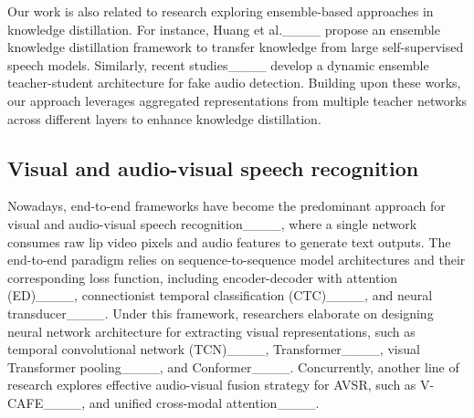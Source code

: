 
Our work is also related to research exploring ensemble-based approaches in knowledge distillation. 
For instance, Huang et al.____ propose an ensemble knowledge distillation framework to transfer knowledge from large self-supervised speech models. 
Similarly, recent studies____ develop a dynamic ensemble teacher-student architecture for fake audio detection. 
Building upon these works, our approach leverages aggregated representations from multiple teacher networks across different layers to enhance knowledge distillation.

 



\subsection{Visual and audio-visual speech recognition}

Nowadays, end-to-end frameworks have become the predominant approach for
visual and audio-visual speech recognition____, where a single network consumes raw lip video pixels and audio features to generate text outputs. The end-to-end paradigm relies on sequence-to-sequence model architectures and their corresponding loss function, including encoder-decoder with attention (ED)____, connectionist temporal classification (CTC)____, and neural transducer____. 
Under this framework, researchers elaborate on designing neural network architecture for extracting visual representations, such as
 temporal convolutional network (TCN)____, Transformer____, visual Transformer pooling____, and Conformer____.
Concurrently, another line of research explores effective audio-visual fusion strategy for AVSR, such as V-CAFE____, and unified cross-modal attention____. 

